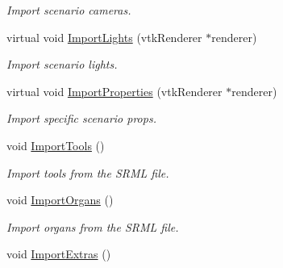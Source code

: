 \begin{DoxyCompactItemize}
\begin{DoxyCompactList}\small\item\em Import scenario cameras. \item\end{DoxyCompactList}\item 
\hypertarget{classvtkSRMLImporter_a61ab6f56309c9b6c43b3a95808289b15}{
virtual void \hyperlink{classvtkSRMLImporter_a61ab6f56309c9b6c43b3a95808289b15}{ImportLights} (vtkRenderer $\ast$renderer)}
\label{classvtkSRMLImporter_a61ab6f56309c9b6c43b3a95808289b15}

\begin{DoxyCompactList}\small\item\em Import scenario lights. \item\end{DoxyCompactList}\item 
\hypertarget{classvtkSRMLImporter_a7ade871037a4eb59dc5ca1f992a317f8}{
virtual void \hyperlink{classvtkSRMLImporter_a7ade871037a4eb59dc5ca1f992a317f8}{ImportProperties} (vtkRenderer $\ast$renderer)}
\label{classvtkSRMLImporter_a7ade871037a4eb59dc5ca1f992a317f8}

\begin{DoxyCompactList}\small\item\em Import specific scenario props. \item\end{DoxyCompactList}\item 
\hypertarget{classvtkSRMLImporter_ab53a27248ca119d09471c76f6b917b4d}{
void \hyperlink{classvtkSRMLImporter_ab53a27248ca119d09471c76f6b917b4d}{ImportTools} ()}
\label{classvtkSRMLImporter_ab53a27248ca119d09471c76f6b917b4d}

\begin{DoxyCompactList}\small\item\em Import tools from the SRML file. \item\end{DoxyCompactList}\item 
\hypertarget{classvtkSRMLImporter_af6b4e429bdad5c181ccd705be44ca7a4}{
void \hyperlink{classvtkSRMLImporter_af6b4e429bdad5c181ccd705be44ca7a4}{ImportOrgans} ()}
\label{classvtkSRMLImporter_af6b4e429bdad5c181ccd705be44ca7a4}

\begin{DoxyCompactList}\small\item\em Import organs from the SRML file. \item\end{DoxyCompactList}\item 
\hypertarget{classvtkSRMLImporter_a927423e106a4de3f28ede240178585a3}{
void \hyperlink{classvtkSRMLImporter_a927423e106a4de3f28ede240178585a3}{ImportExtras} ()}
\label{classvtkSRMLImporter_a927423e106a4de3f28ede240178585a3}


\end{DoxyCompactItemize}
